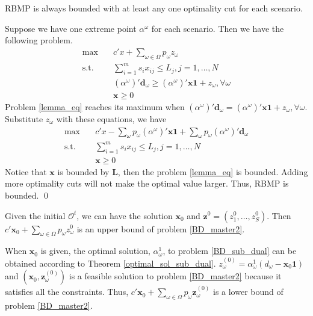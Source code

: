 \begin{lem}\label{one_ep_feasible}
RBMP is always bounded with at least any one optimality cut for each scenario.
\end{lem}

\begin{pf}
  Suppose we have one extreme point $\alpha^{\omega}$ for each scenario. Then we have the following problem.
  \begin{equation}\label{lemma_eq}
    \begin{aligned}
      \max \quad & c{'} x + \sum_{\omega \in \Omega} p_{\omega} z_{\omega} \\
      \text {s.t.} \quad & \sum_{i=1}^{m} s_{i} x_{ij} \leq L_j, j =1,\ldots, N \\
      & (\alpha^{\omega}){'}\mathbf{d}_{\omega} \geq (\alpha^{\omega}){'} \mathbf{x} \mathbf{1} + z_{\omega}, \forall \omega \\
       & \mathbf{x} \geq 0
    \end{aligned}
  \end{equation}
  Problem \eqref{lemma_eq} reaches its maximum when $(\alpha^{\omega}){'}\mathbf{d}_{\omega} = (\alpha^{\omega}){'} \mathbf{x} \mathbf{1} + z_{\omega}, \forall \omega$. Substitute $z_{\omega}$ with these equations, we have 
  \begin{equation}\label{lemma_eq2}
    \begin{aligned}
      \max \quad & c{'} x - \sum_{\omega}p_{\omega}(\alpha^{\omega}){'} \mathbf{x} \mathbf{1} + \sum_{\omega} p_{\omega} (\alpha^{\omega}){'} \mathbf{d}_{\omega} \\
      \text {s.t.} \quad & \sum_{i=1}^{m} s_{i} x_{ij} \leq L_j, j =1,\ldots, N \\
      & \mathbf{x} \geq 0
    \end{aligned}
  \end{equation}
  Notice that $\mathbf{x}$ is bounded by $\mathbf{L}$, then the problem \eqref{lemma_eq} is bounded. Adding more optimality cuts will not make the optimal value larger. Thus, RBMP is bounded. 
  \qed
\end{pf}

Given the initial $\mathcal{O}^{t}$, we can have the solution $\mathbf{x}_{0}$ and $\mathbf{z}^{0} =(z^{0}_1,\ldots, z^{0}_S)$. Then $c{'} \mathbf{x}_0 + \sum_{\omega \in \Omega} p_{\omega} z_{\omega}^{0}$ is an upper bound of problem \eqref{BD_master2}. 


When $\mathbf{x}_0$ is given, the optimal solution, $\alpha_{\omega}^{1}$, to problem \eqref{BD_sub_dual} can be obtained according to Theorem \ref{optimal_sol_sub_dual}. $z_{\omega}^{(0)} = \alpha_{\omega}^{1}(d_{\omega} - \mathbf{x}_0 \mathbf{1})$ and $(\mathbf{x}_0, \mathbf{z}_{\omega}^{(0)})$ is a feasible solution to problem \eqref{BD_master2} because it satisfies all the constraints. Thus, $c{'} \mathbf{x}_0 + \sum_{\omega \in \Omega} p_{\omega} \mathbf{z}_{\omega}^{(0)}$ is a lower bound of problem \eqref{BD_master2}.

